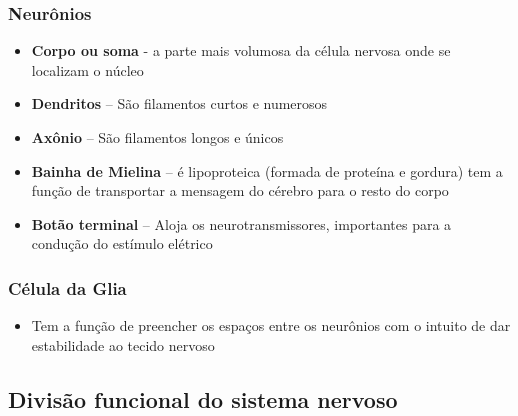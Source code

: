 \documentclass[
]{book}
\providecommand{\tightlist}{%
  \setlength{\itemsep}{0pt}\setlength{\parskip}{0pt}}
\begin{document}
\hypertarget{neuruxf4nios}{%
\subsubsection{Neurônios}\label{neuruxf4nios}}

\begin{itemize}
\tightlist
\item
  \textbf{Corpo ou soma} - a parte mais volumosa da célula nervosa onde se localizam o núcleo
\item
  \textbf{Dendritos} -- São filamentos curtos e numerosos
\item
  \textbf{Axônio} -- São filamentos longos e únicos
\item
  \textbf{Bainha de Mielina} -- é lipoproteica (formada de proteína e gordura) tem a função de transportar a mensagem do cérebro para o resto do corpo
\item
  \textbf{Botão terminal} -- Aloja os neurotransmissores, importantes para a condução do estímulo elétrico
\end{itemize}

\hypertarget{cuxe9lula-da-glia}{%
\subsubsection{Célula da Glia}\label{cuxe9lula-da-glia}}

\begin{itemize}
\tightlist
\item
  Tem a função de preencher os espaços entre os neurônios com o intuito de dar estabilidade ao tecido
  nervoso
\end{itemize}

\hypertarget{divisuxe3o-funcional-do-sistema-nervoso}{%
\subsection{Divisão funcional do sistema nervoso}\label{divisuxe3o-funcional-do-sistema-nervoso}}
\end{document}
